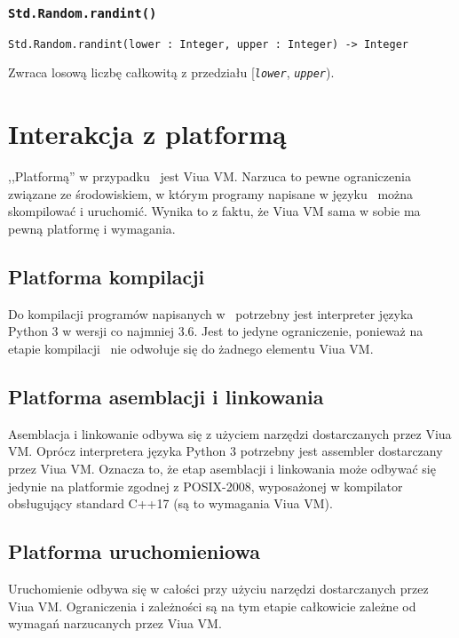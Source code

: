 \subsubsection{\texttt{Std.Random.randint()}}

\begin{small}
\begin{lstlisting}
Std.Random.randint(lower : Integer, upper : Integer) -> Integer
\end{lstlisting}
\end{small}

Zwraca losową liczbę całkowitą z przedziału [\texttt{\emph{lower}}, \texttt{\emph{upper}}).

\section{Interakcja z platformą}

,,Platformą'' w przypadku \ViuAct\ jest Viua VM. Narzuca to pewne ograniczenia związane ze środowiskiem, w
którym programy napisane w języku \ViuAct\ można skompilować i uruchomić. Wynika to z faktu, że Viua VM sama w
sobie ma pewną platformę i wymagania.

\subsection{Platforma kompilacji}

Do kompilacji programów napisanych w \ViuAct\ potrzebny jest interpreter języka Python 3 w wersji co najmniej
3.6. Jest to jedyne ograniczenie, ponieważ na etapie kompilacji \ViuAct\ nie odwołuje się do żadnego elementu
Viua VM.

\subsection{Platforma asemblacji i linkowania}

Asemblacja i linkowanie odbywa się z użyciem narzędzi dostarczanych przez Viua VM.
Oprócz interpretera języka Python 3 potrzebny jest assembler dostarczany przez Viua VM. Oznacza to, że etap
asemblacji i linkowania może odbywać się jedynie na platformie zgodnej z POSIX-2008, wyposażonej w kompilator
obsługujący standard C++17 (są to wymagania Viua VM).

\subsection{Platforma uruchomieniowa}

Uruchomienie odbywa się w całości przy użyciu narzędzi dostarczanych przez Viua VM.
Ograniczenia i zależności są na tym etapie całkowicie zależne od wymagań narzucanych przez Viua VM.
